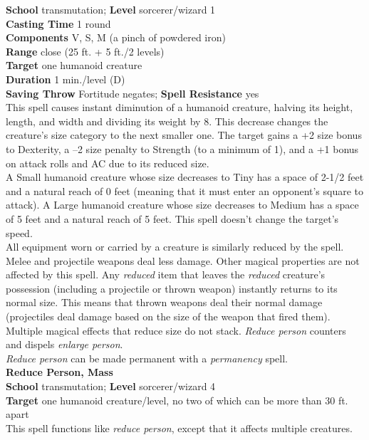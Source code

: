 \textbf{School} transmutation; \textbf{Level} sorcerer/wizard 1\\
\textbf{Casting Time} 1 round\\
\textbf{Components} V, S, M (a pinch of powdered iron)\\
\textbf{Range} close (25 ft. + 5 ft./2 levels)\\
\textbf{Target} one humanoid creature\\
\textbf{Duration} 1 min./level (D)\\
\textbf{Saving Throw} Fortitude negates; \textbf{Spell Resistance} yes\\
This spell causes instant diminution of a humanoid creature, halving its height, length, and width and dividing its weight by 8. This decrease changes the creature's size category to the next smaller one. The target gains a +2 size bonus to Dexterity, a –2 size penalty to Strength (to a minimum of 1), and a +1 bonus on attack rolls and AC due to its reduced size.\\
A Small humanoid creature whose size decreases to Tiny has a space of 2-1/2 feet and a natural reach of 0 feet (meaning that it must enter an opponent's square to attack). A Large humanoid creature whose size decreases to Medium has a space of 5 feet and a natural reach of 5 feet. This spell doesn't change the target's speed.\\
All equipment worn or carried by a creature is similarly reduced by the spell.\\
Melee and projectile weapons deal less damage. Other magical properties are not affected by this spell. Any \textit{reduced }item that leaves the \textit{reduced }creature's possession (including a projectile or thrown weapon) instantly returns to its normal size. This means that thrown weapons deal their normal damage (projectiles deal damage based on the size of the weapon that fired them).\\
Multiple magical effects that reduce size do not stack. \textit{Reduce person }counters and dispels \textit{enlarge person}.\\
\textit{Reduce person }can be made permanent with a \textit{permanency }spell.\\
\textbf{Reduce Person, Mass}\\
\textbf{School} transmutation; \textbf{Level} sorcerer/wizard 4\\
\textbf{Target} one humanoid creature/level, no two of which can be more than 30 ft. apart\\
This spell functions like \textit{reduce person}, except that it affects multiple creatures.\\
